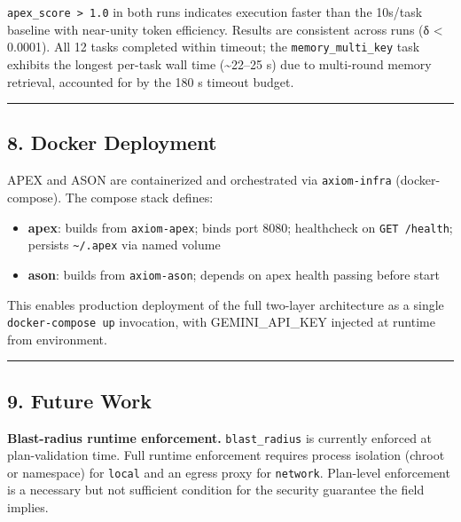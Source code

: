 \texttt{apex\_score\ \textgreater{}\ 1.0} in both runs indicates
execution faster than the 10s/task baseline with near-unity token
efficiency. Results are consistent across runs (δ \textless{} 0.0001).
All 12 tasks completed within timeout; the \texttt{memory\_multi\_key}
task exhibits the longest per-task wall time (\textasciitilde22--25 s)
due to multi-round memory retrieval, accounted for by the 180 s timeout
budget.

\begin{center}\rule{0.5\linewidth}{0.5pt}\end{center}

\subsection{8. Docker Deployment}\label{docker-deployment}

APEX and ASON are containerized and orchestrated via
\texttt{axiom-infra} (docker-compose). The compose stack defines:

\begin{itemize}
\tightlist
\item
  \textbf{apex}: builds from \texttt{axiom-apex}; binds port 8080;
  healthcheck on \texttt{GET\ /health}; persists
  \texttt{\textasciitilde{}/.apex} via named volume
\item
  \textbf{ason}: builds from \texttt{axiom-ason}; depends on apex health
  passing before start
\end{itemize}

This enables production deployment of the full two-layer architecture as
a single \texttt{docker-compose\ up} invocation, with GEMINI\_API\_KEY
injected at runtime from environment.

\begin{center}\rule{0.5\linewidth}{0.5pt}\end{center}

\subsection{9. Future Work}\label{future-work}

\textbf{Blast-radius runtime enforcement.} \texttt{blast\_radius} is
currently enforced at plan-validation time. Full runtime enforcement
requires process isolation (chroot or namespace) for \texttt{local} and
an egress proxy for \texttt{network}. Plan-level enforcement is a
necessary but not sufficient condition for the security guarantee the
field implies.

